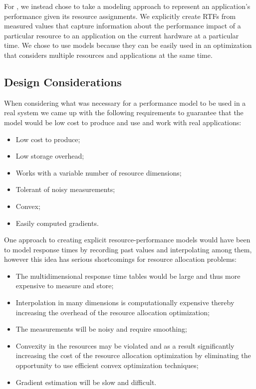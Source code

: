 For \pacora, we instead chose to take a modeling approach to represent an application's performance given its resource assignments.  We explicitly create RTFs from measured values that capture information about the performance impact of a particular resource to an application on the current hardware at a particular time. We chose to use models because they can be easily used in an optimization that considers multiple resources and applications at the same time. 

\subsection{Design Considerations}

When considering what was necessary for a performance model to be used in a real system we came up with the following requirements to guarantee that the model would be low cost to produce and use and work with real applications:
\begin{itemize}
\item Low cost to produce;
\item Low storage overhead;
\item Works with a variable number of resource dimensions;
\item Tolerant of noisy measurements;
\item Convex;
\item Easily computed gradients.
\end{itemize}

One approach to creating explicit resource-performance models would have been to model response times by recording past values and interpolating among them, however this idea has serious shortcomings for resource allocation problems:

\begin{itemize}
\item The multidimensional response time tables would be large and thus more expensive to measure and store;
\item Interpolation in many dimensions is computationally expensive thereby increasing the overhead of the resource allocation optimization;
\item The measurements will be noisy and require smoothing;
\item Convexity in the resources may be violated and as a result significantly increasing the cost of the resource allocation optimization by eliminating the opportunity to use efficient convex optimization techniques;
\item Gradient estimation will be slow and difficult.
\end{itemize}

